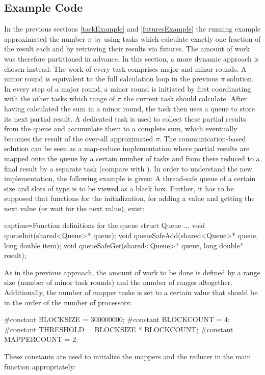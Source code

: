 \subsection{Example Code}
\label{sharedMemoryExample}
In the previous sections \ref{taskExample} and \ref{futuresExample} the running example approximated the number $\pi$ by using tasks which calculate exactly one fraction of the result each and by retrieving their results via futures. The amount of work was therefore partitioned in advance. In this section, a more dynamic approach is chosen instead: The work of every task comprises major and minor rounds. A minor round is equivalent to the full calculation loop in the previous $\pi$ solution. In every step of a major round, a minor round is initiated by first coordinating with the other tasks which range of $\pi$ the current task should calculate. After having calculated the sum in a minor round, the task then uses a queue to store its next partial result. A dedicated task is used to collect these partial results from the queue and accumulate them to a complete sum, which eventually becomes the result of the over-all approximated $\pi$. The communication-based solution can be seen as a map-reduce implementation where partial results are mapped onto the queue by a certain number of tasks and from there reduced to a final result by a separate task (compare with \cite{MapReduce}).
In order to understand the new implementation, the following example is given: A thread-safe queue of a certain size and slots of type  is to be viewed as a black box. Further, it has to be supposed that functions for the initialization, for adding a value and getting the next value (or wait for the next value), exist:
\begin{ccode}{caption=Function definitions for the queue}
struct Queue {...}
void queueInit(shared<Queue>* queue);
void queueSafeAdd(shared<Queue>* queue, long double item);
void queueSafeGet(shared<Queue>* queue, long double* result);
\end{ccode}
As in the previous approach, the amount of work to be done is defined by a range size (number of minor task rounds) and the number of ranges altogether. Additionally, the number of mapper tasks is set to a certain value that should be in the order of the number of processors:
\begin{ccode}{}
#constant BLOCKSIZE = 300000000; 
#constant BLOCKCOUNT = 4; 
#constant THRESHOLD = BLOCKSIZE * BLOCKCOUNT; 
#constant MAPPERCOUNT = 2;
\end{ccode}
These constants are used to initialize the mappers and the reducer in the main function appropriately:
